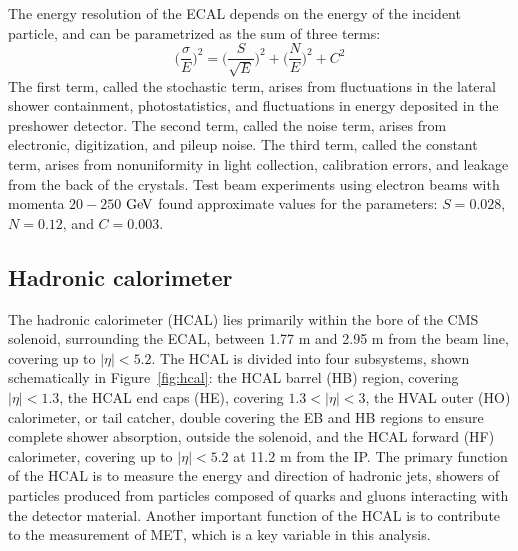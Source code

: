 \indent The energy resolution of the ECAL depends on the energy of the incident particle, and can be parametrized as the sum of three terms:
\begin{equation}
\bigg(\frac{\sigma}{E}\bigg)^2 = \bigg(\frac{S}{\sqrt{E}}\bigg)^2 + \bigg(\frac{N}{E}\bigg)^2 + C^2
\end{equation}
The first term, called the stochastic term, arises from fluctuations in the lateral shower containment, photostatistics, and fluctuations in energy deposited in the preshower detector. The second term, called the noise term, arises from electronic, digitization, and pileup noise. The third term, called the constant term, arises from nonuniformity in light collection, calibration errors, and leakage from the back of the crystals. Test beam experiments using electron beams with momenta $20-250$ $\mathrm{Ge\kern -0.1em V}$ found approximate values for the parameters: $S=0.028$, $N=0.12$, and $C=0.003$. 

\subsection{Hadronic calorimeter}

The hadronic calorimeter (HCAL) lies primarily within the bore of the CMS solenoid, surrounding the ECAL, between 1.77 m and 2.95 m from the beam line, covering up to $|\eta|<5.2$. The HCAL is divided into four subsystems, shown schematically in Figure~\ref{fig:hcal}: the HCAL barrel (HB) region, covering $|\eta|<1.3$, the HCAL end caps (HE), covering $1.3<|\eta|<3$, the HVAL outer (HO) calorimeter, or tail catcher, double covering the EB and HB regions to ensure complete shower absorption, outside the solenoid, and the HCAL forward (HF) calorimeter, covering up to $|\eta|<5.2$ at 11.2 m from the IP. The primary function of the HCAL is to measure the energy and direction of hadronic jets, showers of particles produced from particles composed of quarks and gluons interacting with the detector material. Another important function of the HCAL is to contribute to the measurement of MET, which is a key variable in this analysis. 

